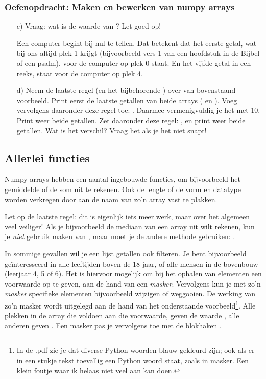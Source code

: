 \documentclass[a4paper,11pt, fleqn]{article}
\begin{document}
\subsubsection*{Oefenopdracht: Maken en bewerken van numpy arrays}
\begin{itemize}
	\item[c)] Vraag: wat is de waarde van ? Let goed op!
	
	Een computer begint bij nul te tellen. Dat betekent dat het eerste getal, wat bij ons altijd plek 1 krijgt (bijvoorbeeld vers 1 van een hoofdstuk in de Bijbel of een psalm), voor de computer op plek 0 staat. En het vijfde getal in een reeks, staat voor de computer op plek 4.
	
	\item[d)] Neem de laatste regel (en het bijbehorende ) over van bovenstaand voorbeeld. Print eerst de laatste getallen van beide arrays ( en ). Voeg vervolgens daaronder deze regel toe: . Daarmee vermenigvuldig je het  met 10. Print weer beide getallen. Zet daaronder deze regel: , en print weer beide getallen. Wat is het verschil? Vraag het als je het niet snapt!
\end{itemize}

\subsection{Allerlei functies}
Numpy arrays hebben een aantal ingebouwde functies, om bijvoorbeeld het gemiddelde of de som uit te rekenen. Ook de lengte of de vorm en datatype worden verkregen door  aan de naam van zo'n array vast te plakken.


Let op de laatste regel: dit is eigenlijk iets meer werk, maar over het algemeen veel veiliger! Als je bijvoorbeeld de mediaan van een array uit wilt rekenen, kun je {\it niet} gebruik maken van , maar moet je de andere methode gebruiken: .

In sommige gevallen wil je een lijst getallen ook filteren. Je bent bijvoorbeeld geïnteresseerd in alle leeftijden boven de 18 jaar, of alle mensen in de bovenbouw (leerjaar 4, 5 of 6). Het is hiervoor mogelijk om bij het ophalen van elementen een voorwaarde op te geven, aan de hand van een {\it masker}. Vervolgens kun je met zo'n {\it masker} specifieke elementen bijvoorbeeld wijzigen of weggooien. De werking van zo'n masker wordt uitgelegd aan de hand van het onderstaande voorbeeld\footnote{In de .pdf zie je dat diverse Python woorden blauw gekleurd zijn; ook als er in een stukje tekst toevallig een Python woord staat, zoals in masker. Een klein foutje waar ik helaas niet veel aan kan doen.}. Alle plekken in de array die voldoen aan die voorwaarde, geven de waarde , alle anderen geven . Een masker pas je vervolgens toe met de blokhaken \pythoninline{[ ]}.
\end{document}
